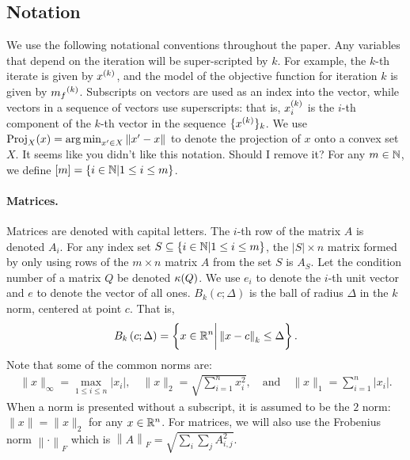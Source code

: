 \documentclass{article}
\begin{document}
\subsection{Notation}
We use the following notational conventions throughout the paper.
Any variables that depend on the iteration will be super-scripted by $k$.
For example, the $k$-th iterate is given by $x^{(k)}$,
and the model of the objective function for iteration $k$ is given by ${{m}_f}^{(k)}$.
Subscripts on vectors are used as an index into the vector, while vectors in a sequence of vectors use superscripts:
that is, $x_i^{(k)}$ is the $i$-th component of the $k$-th vector in the sequence $\{x^{(k)}\}_k$.
We use ${\textrm{Proj}}_X(x) = \operatorname*{arg\,min}_{x' \in X}\left\|x' - x\right\|$ to denote the projection of $x$ onto a convex set $X$.
\color{magenta}
It seems like you didn't like this notation. Should I remove it?
\color{black}
For any $m \in \mathbb N$, we define $[m] = \left\{i \in \mathbb N | 1 \le i \le m\right\}$.

\paragraph*{Matrices.}
Matrices are denoted with capital letters.
The $i$-th row of the matrix $A$ is denoted $A_i$.
For any index set $S \subseteq \{i \in \mathbb N | 1 \le i \le m\}$, the $|S| \times n$ matrix formed by only using
rows of the $m\times n$ matrix $A$ from the set $S$ is $A_S$.
Let the condition number of a matrix $Q$ be denoted ${\kappa}(Q)$.
We use $e_i$ to denote the $i$-th unit vector and $e$ to denote the vector of all ones.
$B_k\left(c; \Delta\right)$ is the ball of radius $\Delta$ in the $k$ norm, centered at point $c$.  That is,
\begin{align}
\label{define_ball}
B_k\left(c; \Delta\right) = \left\{x \in \mathbb R^n \bigg | \left\|x - c\right\|_k \le \Delta \right\}.
\end{align}
Note that some of the common norms are:
\begin{align*}
\|x\|_{\infty} = \max_{1\le i\le n}|x_i|, \quad
\|x\|_{2} = \sqrt{\sum_{i=1}^n x_i^2}, \quad \textrm{and} \quad
\|x\|_1 = \sum_{i = 1}^n |x_i|.
\end{align*}
When a norm is presented without a subscript, it is assumed to be the $2$ norm: $\|x\| = \|x\|_2$ for any $x \in \mathbb R^n$.
For matrices, we will also use the Frobenius norm $\left\|\cdot\right\|_F$ which is $\left\|A\right\|_F = \sqrt{\sum_i\sum_jA_{i, j}^2}$.
\end{document}
